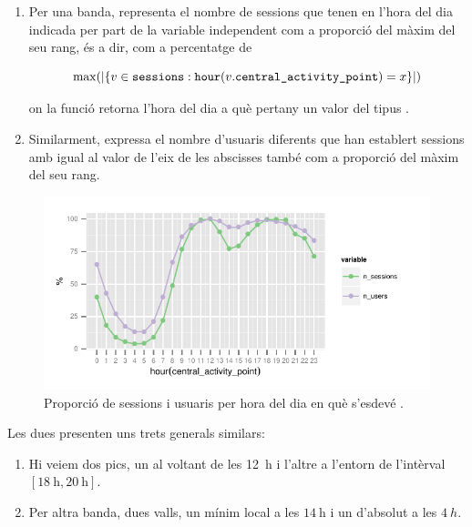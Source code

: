 \documentclass[
	a4paper,
	twoside,
	justified
]{tufte-book}
\begin{document}
\begin{enumerate}[(1)]
\item Per una banda,  representa el nombre de sessions que tenen  en l'hora del dia indicada per part de la variable independent com a proporció del màxim del seu rang, és a dir, com a percentatge de
 
$$
\max(|\{v \in \texttt{sessions} : \texttt{hour}(v.\texttt{central\_activity\_point})= x\}|)
$$

on la funció  retorna l'hora del dia a què pertany un valor del tipus .


\item Similarment,  expressa el nombre d'usuaris diferents que han establert sessions amb  igual al valor de l'eix de les abscisses també com a proporció del màxim del seu rang.   
\end{enumerate} 

\begin{figure}
\begin{center}
\includegraphics{student_session_hour_scatter}
\caption{
	\label{graph:student_session_hour_scatter}
	Proporció de sessions i usuaris per hora del dia en què s'esdevé . 
}
\end{center}
\end{figure}

Les dues presenten uns trets generals similars:

\begin{enumerate}[(1)]
\item Hi veiem dos pics, un al voltant de les \SI{12}{\hour} i l'altre a l'entorn de l'intèrval $[\SI{18}{\hour}, \SI{20}{\hour}]$.
\item Per altra banda, dues valls, un mínim local a les $\SI{14}{\hour}$ i un d'absolut a les $\SI{4}{h}$.
\end{enumerate}
\end{document}
